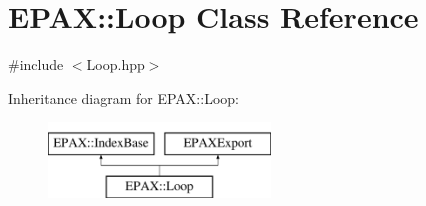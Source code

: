 \hypertarget{class_e_p_a_x_1_1_loop}{\section{\-E\-P\-A\-X\-:\-:\-Loop \-Class \-Reference}
\label{class_e_p_a_x_1_1_loop}
}


{\ttfamily \#include $<$\-Loop.\-hpp$>$}

\-Inheritance diagram for \-E\-P\-A\-X\-:\-:\-Loop\-:\begin{figure}[H]
\begin{center}
\leavevmode
\includegraphics[height=2.000000cm]{class_e_p_a_x_1_1_loop}
\end{center}
\end{figure}

